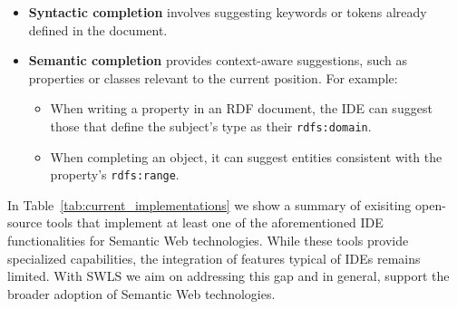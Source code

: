 \begin{itemize}
    \item \textbf{Syntactic completion} involves suggesting keywords or tokens already defined in the document.
    \item \textbf{Semantic completion} provides context-aware suggestions, such as properties or classes relevant to the current position. For example:
    \begin{itemize}
        \item When writing a property in an RDF document, the IDE can suggest those that define the subject's type as their \texttt{rdfs:domain}.
        \item When completing an object, it can suggest entities consistent with the property's \texttt{rdfs:range}.
    \end{itemize}
\end{itemize}

In Table~\ref{tab:current_implementations} we show a summary of exisiting open-source tools that implement at least one of the aforementioned IDE functionalities for Semantic Web technologies.
While these tools provide specialized capabilities, the integration of features typical of IDEs remains limited.
With SWLS we aim on addressing this gap and in general, support the broader adoption of Semantic Web technologies. 

